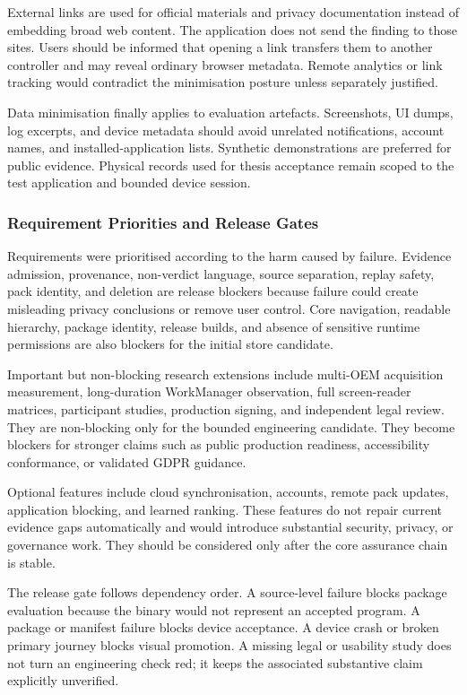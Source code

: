 External links are used for official materials and privacy documentation instead of embedding broad web content. The application does not send the finding to those sites. Users should be informed that opening a link transfers them to another controller and may reveal ordinary browser metadata. Remote analytics or link tracking would contradict the minimisation posture unless separately justified.

Data minimisation finally applies to evaluation artefacts. Screenshots, UI dumps, log excerpts, and device metadata should avoid unrelated notifications, account names, and installed-application lists. Synthetic demonstrations are preferred for public evidence. Physical records used for thesis acceptance remain scoped to the test application and bounded device session.

\subsubsection{Requirement Priorities and Release Gates}

Requirements were prioritised according to the harm caused by failure. Evidence admission, provenance, non-verdict language, source separation, replay safety, pack identity, and deletion are release blockers because failure could create misleading privacy conclusions or remove user control. Core navigation, readable hierarchy, package identity, release builds, and absence of sensitive runtime permissions are also blockers for the initial store candidate.

Important but non-blocking research extensions include multi-OEM acquisition measurement, long-duration WorkManager observation, full screen-reader matrices, participant studies, production signing, and independent legal review. They are non-blocking only for the bounded engineering candidate. They become blockers for stronger claims such as public production readiness, accessibility conformance, or validated GDPR guidance.

Optional features include cloud synchronisation, accounts, remote pack updates, application blocking, and learned ranking. These features do not repair current evidence gaps automatically and would introduce substantial security, privacy, or governance work. They should be considered only after the core assurance chain is stable.

The release gate follows dependency order. A source-level failure blocks package evaluation because the binary would not represent an accepted program. A package or manifest failure blocks device acceptance. A device crash or broken primary journey blocks visual promotion. A missing legal or usability study does not turn an engineering check red; it keeps the associated substantive claim explicitly unverified.

